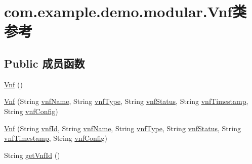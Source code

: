 \hypertarget{classcom_1_1example_1_1demo_1_1modular_1_1_vnf}{}\section{com.\+example.\+demo.\+modular.\+Vnf类 参考}
\label{classcom_1_1example_1_1demo_1_1modular_1_1_vnf}
\subsection*{Public 成员函数}
\begin{DoxyCompactItemize}
\item 
\mbox{\hyperlink{classcom_1_1example_1_1demo_1_1modular_1_1_vnf_a4928fcf0ef98283ef7faf6c8f7a14ee5}{Vnf}} ()
\item 
\mbox{\hyperlink{classcom_1_1example_1_1demo_1_1modular_1_1_vnf_a12c82c94eb21c3d5dd8babffb632cadd}{Vnf}} (String \mbox{\hyperlink{classcom_1_1example_1_1demo_1_1modular_1_1_vnf_a38cae2daf10c2cdf85f7518da4236f57}{vnf\+Name}}, String \mbox{\hyperlink{classcom_1_1example_1_1demo_1_1modular_1_1_vnf_aa5f7a03f548a4bc1ed654b2f4011dba1}{vnf\+Type}}, String \mbox{\hyperlink{classcom_1_1example_1_1demo_1_1modular_1_1_vnf_ac527b9b915a9d7ce5d8e043ef5b67ef5}{vnf\+Status}}, String \mbox{\hyperlink{classcom_1_1example_1_1demo_1_1modular_1_1_vnf_a36bceb91ee138a8c7cf6e485cafb5183}{vnf\+Timestamp}}, String \mbox{\hyperlink{classcom_1_1example_1_1demo_1_1modular_1_1_vnf_a03ea73b5ecb79146538403f79c7383bf}{vnf\+Config}})
\item 
\mbox{\hyperlink{classcom_1_1example_1_1demo_1_1modular_1_1_vnf_aa2e59d3453c2b4c8c00ab5560d680189}{Vnf}} (String \mbox{\hyperlink{classcom_1_1example_1_1demo_1_1modular_1_1_vnf_a3a636f275db30e480bef5aad900979c3}{vnf\+Id}}, String \mbox{\hyperlink{classcom_1_1example_1_1demo_1_1modular_1_1_vnf_a38cae2daf10c2cdf85f7518da4236f57}{vnf\+Name}}, String \mbox{\hyperlink{classcom_1_1example_1_1demo_1_1modular_1_1_vnf_aa5f7a03f548a4bc1ed654b2f4011dba1}{vnf\+Type}}, String \mbox{\hyperlink{classcom_1_1example_1_1demo_1_1modular_1_1_vnf_ac527b9b915a9d7ce5d8e043ef5b67ef5}{vnf\+Status}}, String \mbox{\hyperlink{classcom_1_1example_1_1demo_1_1modular_1_1_vnf_a36bceb91ee138a8c7cf6e485cafb5183}{vnf\+Timestamp}}, String \mbox{\hyperlink{classcom_1_1example_1_1demo_1_1modular_1_1_vnf_a03ea73b5ecb79146538403f79c7383bf}{vnf\+Config}})
\item 
String \mbox{\hyperlink{classcom_1_1example_1_1demo_1_1modular_1_1_vnf_ad7a8e2e8f3b9adba77e1ea9718b22fc7}{get\+Vnf\+Id}} ()

\end{DoxyCompactItemize}
